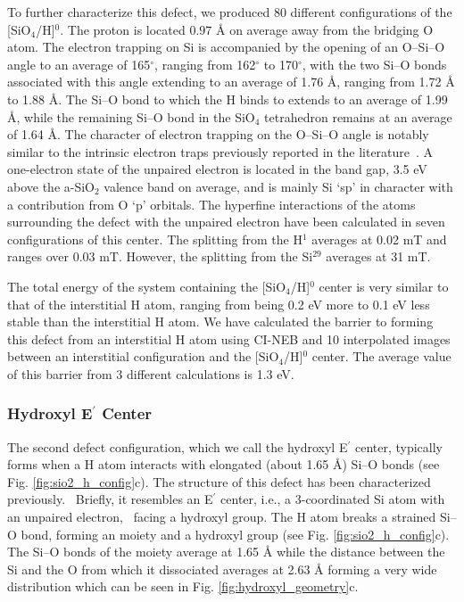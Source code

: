 \documentclass[aps,prb,reprint,superscriptaddress,showpacs]{revtex4-1}
\begin{document}
To further characterize this defect, we produced 80 different configurations of the [SiO$_4$/H]$^0$. The proton is located $0.97$ {\AA} on average away from the bridging O atom. The electron trapping on Si is accompanied by the opening of an \mbox{O--Si--O} angle to an average of 165$^\circ$, ranging from 162$^\circ$ to 170$^\circ$, with the two \mbox{Si--O} bonds associated with this angle extending to an average of 1.76 {\AA}, ranging from 1.72 {\AA} to 1.88 {\AA}. The \mbox{Si--O} bond to which the H binds to extends to an average of 1.99 {\AA}, while the remaining \mbox{Si--O} bond in the SiO$_4$ tetrahedron remains at an average of 1.64 {\AA}. The character of electron trapping on the \mbox{O--Si--O} angle is notably similar to the intrinsic electron traps previously reported in the literature~\cite{electron_trap_sio2,aelsayed_prb}. A one-electron state of the unpaired electron is located in the band gap, 3.5 eV above the a-SiO$_2$ valence band on average, and is mainly Si `sp' in character with a contribution from O `p' orbitals. The hyperfine interactions of the atoms surrounding the defect with the unpaired electron have been calculated in seven configurations of this center. The splitting from the H$^1$ averages at 0.02 mT and ranges over 0.03 mT. However, the splitting from the Si$^{29}$ averages at 31 mT. 

The total energy of the system containing the [SiO$_4$/H]$^0$ center is very similar to that of the interstitial H atom, ranging from being 0.2 eV more to 0.1 eV less stable than the interstitial H atom. We have calculated the barrier to forming this defect from an interstitial H atom using CI-NEB and 10 interpolated images between an interstitial configuration and the [SiO$_4$/H]$^0$ center. The average value of this barrier from 3 different calculations is 1.3 eV. 


\subsubsection{Hydroxyl E$^\prime$ Center}

The second defect configuration, which we call the hydroxyl E$^\prime$ center, typically forms when a H atom interacts with elongated (about 1.65 {\AA}) \mbox{Si--O} bonds (see Fig. \ref{fig:sio2_h_config}c). The structure of this defect has been characterized previously.~\cite{aelsayed_prl} Briefly, it resembles an E$^\prime$ center, i.e., a 3-coordinated Si atom with an unpaired electron,~\cite{rudra_eprime} facing a hydroxyl group. The H atom breaks a strained \mbox{Si--O} bond, forming an \hspace{2 pt} moiety and a hydroxyl group (see Fig. \ref{fig:sio2_h_config}c). The \mbox{Si--O} bonds of the \hspace{2 pt} moiety average at 1.65 {\AA} while the distance between the Si and the O from which it dissociated averages at 2.63 {\AA} forming a very wide distribution which can be seen in Fig. \ref{fig:hydroxyl_geometry}c. 
\end{document}
